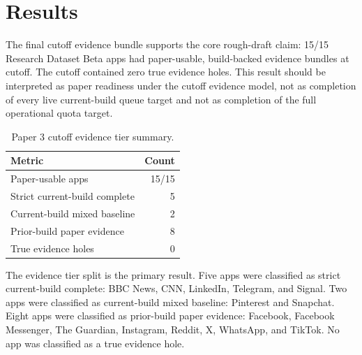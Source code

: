 \section{Results}

The final cutoff evidence bundle supports the core rough-draft claim: 15/15 Research Dataset Beta apps had paper-usable, build-backed evidence bundles at cutoff. The cutoff contained zero true evidence holes. This result should be interpreted as paper readiness under the cutoff evidence model, not as completion of every live current-build queue target and not as completion of the full operational quota target.

\begin{table}[htbp]
\caption{Paper 3 cutoff evidence tier summary.}
\label{tab:evidence-tier-summary}
\centering
\begin{tabular}{lr}
\toprule
Metric & Count \\
\midrule
Paper-usable apps & 15/15 \\
Strict current-build complete & 5 \\
Current-build mixed baseline & 2 \\
Prior-build paper evidence & 8 \\
True evidence holes & 0 \\
\bottomrule
\end{tabular}
\end{table}

The evidence tier split is the primary result. Five apps were classified as strict current-build complete: BBC News, CNN, LinkedIn, Telegram, and Signal. Two apps were classified as current-build mixed baseline: Pinterest and Snapchat. Eight apps were classified as prior-build paper evidence: Facebook, Facebook Messenger, The Guardian, Instagram, Reddit, X, WhatsApp, and TikTok. No app was classified as a true evidence hole.

